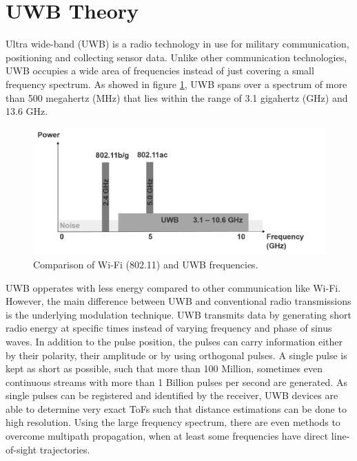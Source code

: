 
\section{UWB Theory}
Ultra wide-band (UWB) is a radio technology in use for military communication, positioning and collecting sensor data. Unlike other communication technologies, UWB occupies a wide area of frequencies instead of just covering a small frequency spectrum. As showed in figure \ref{fig:frequency_spectrum}, UWB spans over a spectrum of more than 500 megahertz (MHz) that lies within the range of 3.1 gigahertz (GHz) and 13.6 GHz.
\begin{figure}[th]
\centering
\includegraphics[width=1.0\textwidth]{Figures/frequency_spectrum}
\decoRule
\caption[UWB frequency spectrum]{Comparison of Wi-Fi (802.11) and UWB frequencies.}
\label{fig:frequency_spectrum}
\end{figure}
UWB opperates with less energy compared to other communication like Wi-Fi. However, the main difference between UWB and conventional radio transmissions is the underlying modulation technique. UWB transmits data by generating short radio energy at specific times instead of varying frequency and phase of sinus waves. In addition to the pulse position, the pulses can carry information either by their polarity, their amplitude or by using orthogonal pulses.
A single pulse is kept as short as possible, such that more than 100 Million, sometimes even continuous streams with more than 1 Billion pulses per second are generated. As single pulses can be registered and identified by the receiver, UWB devices are able to determine very exact ToFs such that distance estimations can be done to high resolution. Using the large frequency spectrum, there are even methods to overcome multipath propagation, when at least some frequencies have direct line-of-sight trajectories.


